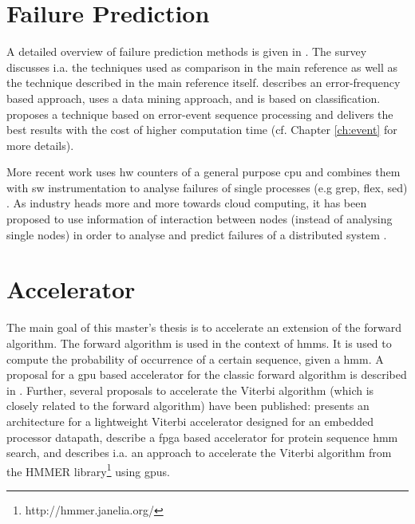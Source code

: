 \documentclass[mscthesis]{usiinfthesis}
\begin{document}
\section{Failure Prediction}
\label{ch:art_pred}
A detailed overview of failure prediction methods is given in
\cite{ACM10_Salfner}. The survey discusses i.a. the techniques used as
comparison in the main reference
\cite{lin88,IEEE90_lin,ICDM02_Vilalta,domeniconi02} as well as the technique
described in the main reference \cite{salfner08} itself. \cite{lin88} describes
an error-frequency based approach, \cite{ICDM02_Vilalta} uses a data mining
approach, and \cite{domeniconi02} is based on classification. \cite{salfner08}
proposes a technique based on error-event sequence processing and delivers
the best results with the cost of higher computation time (cf. Chapter
\ref{ch:event} for more details).

More recent work uses \gls{hw} counters of a general purpose \gls{cpu} and
combines them with \gls{sw} instrumentation to analyse failures of single
processes (e.g grep, flex, sed) \cite{FSE10_Yilmaz}. As industry heads more and
more towards cloud computing, it has been proposed to use information of
interaction between nodes (instead of analysing single nodes) in order to
analyse and predict failures of a distributed system
\cite{IEEE12_Salfner,DSN10_Oliner}.

\section{Accelerator}
\label{ch:art_acc}

The main goal of this master's thesis is to accelerate an extension of the
forward algorithm. The forward algorithm is used in the context of \glspl{hmm}.
It is used to compute the probability of occurrence of a certain sequence,
given a \gls{hmm}. A proposal for a \gls{gpu} based accelerator for the classic
forward algorithm is described in \cite{liu09}. Further, several proposals to
accelerate the Viterbi algorithm (which is closely related to the forward
algorithm) have been published: \cite{ASAP12_Azhar} presents an architecture
for a lightweight Viterbi accelerator designed for an embedded processor
datapath, \cite{IPDPS07_Jacob,ICS06_Maddimsetty,IPDPS07_Oliver} describe
a \gls{fpga} based accelerator for protein sequence \gls{hmm} search, and
\cite{IPDPS09_Walters} describes i.a. an approach to accelerate the Viterbi
algorithm from the HMMER library\footnote{http://hmmer.janelia.org/} using
\glspl{gpu}.
\end{document}
